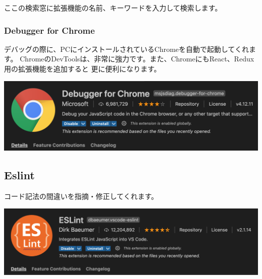 ここの検索窓に拡張機能の名前、キーワードを入力して検索します。

\subsubsection*{Debugger for Chrome}
\keeplastskip{
  \label{sec:1-2-2-1}
  \par\nobreak
}

デバッグの際に、PCにインストールされているChromeを自動で起動してくれます。
ChromeのDevToolsは、非常に強力です。また、ChromeにもReact、Redux用の拡張機能を追加すると
更に便利になります。

\begin{reviewimage}[H]%
\includegraphics[width=1.0\maxwidth]{./images/01-createDevEnv/01_06vscodeExtension_debuggerForChrome.png}%
\label{image:01-createDevEnv:01_06vscodeExtension_debuggerForChrome}
\end{reviewimage}

\subsection{Eslint}
\keeplastskip{
  \label{sec:1-2-3}
  \par\nobreak
}

コード記法の間違いを指摘・修正してくれます。

\begin{reviewimage}[H]%
\includegraphics[width=1.0\maxwidth]{./images/01-createDevEnv/01_07vscodeExtension_eslint.png}%
\label{image:01-createDevEnv:01_07vscodeExtension_eslint}
\end{reviewimage}

